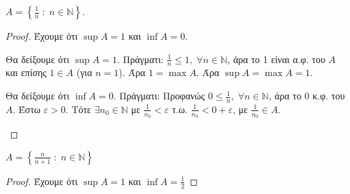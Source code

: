 \begin{enumerate}
      \item {\boldmath \textcolor{Col2}{$ A = \left\{ \frac{1}{n} \; 
        : \; n \in \mathbb{N} \right\} $}}.
        \begin{proof}
        \item {}
          Έχουμε ότι $ \sup A = 1 $ και $ \inf A = 0 $.
          \begin{myitemize}
            \item Θα δείξουμε ότι $ \sup A = 1 $. Πράγματι:
              $ \frac{1}{n} \leq 1, \; \forall n \in \mathbb{N} $, άρα το 1 είναι 
              α.φ. του $A$ και επίσης $ 1 \in A $ (για $ n=1 $). 
              Άρα $ 1 = \max A $. Άρα $ \sup A = \max A = 1 $.
            \item Θα δείξουμε ότι $ \inf A = 0 $. Πράγματι:
              Προφανώς $ 0 \leq \frac{1}{n}, \; \forall n \in \mathbb{N} $, 
              άρα το $ 0 $ κ.φ. του $A$.
              Έστω $ \varepsilon > 0 $. Τότε $ \exists n_{0} \in \mathbb{N} $
              με $ \frac{1}{n_{0}} < \varepsilon $ τ.ω. $ \frac{1}{n_{0}} 
              < 0 + \varepsilon$, με $ \frac{1}{n_{0}} \in A $.
          \end{myitemize}
        \end{proof}
      \item {\boldmath \textcolor{Col2}{$ A = \left\{ \frac{n}{n+1} \; 
        : \; n \in \mathbb{N} \right\} $ }}
        \begin{proof}
        \item {}
          Έχουμε ότι $ \sup A = 1 $ και $ \inf A = \frac{1}{2} $
\end{proof}
\end{enumerate}
